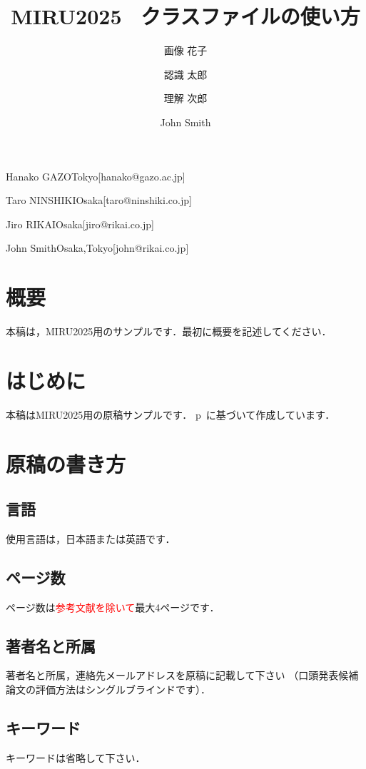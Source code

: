 \documentclass[MIRU,submit]{miru2025j}
\begin{document}
\title{MIRU2025 \LaTeXe\ クラスファイルの使い方}


 \author{画像 花子}{Hanako GAZO}{Tokyo}[hanako@gazo.ac.jp]
 \author{認識 太郎}{Taro NINSHIKI}{Osaka}[taro@ninshiki.co.jp]
 \author{理解 次郎}{Jiro RIKAI}{Osaka}[jiro@rikai.co.jp]
 \author{John Smith}{John Smith}{Osaka,Tokyo}[john@rikai.co.jp]


\maketitle

\section*{概要}
本稿は，MIRU2025用のサンプルです．最初に概要を記述してください．

\section{はじめに}
本稿はMIRU2025用の原稿サンプルです．
p\LaTeXe\ に基づいて作成しています．

\section{原稿の書き方}

\subsection{言語}
使用言語は，日本語または英語です．

\subsection{ページ数}
ページ数は\textcolor{red}{参考文献を除いて}最大4ページです．

\subsection{著者名と所属}
著者名と所属，連絡先メールアドレスを原稿に記載して下さい
（口頭発表候補論文の評価方法はシングルブラインドです）．

\subsection{キーワード}
キーワードは省略して下さい．
\end{document}
